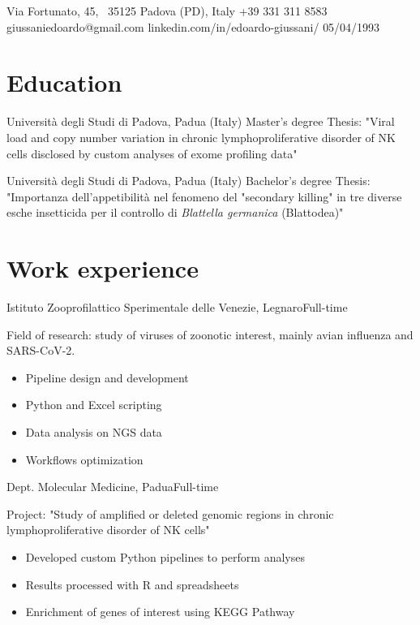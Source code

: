 \documentclass{fancy_cv}
\author{Edoardo Giussani}
\begin{document}
    {Via Fortunato, 45, \ 35125 Padova (PD), Italy}
    {+39 331 311 8583}
    {giussaniedoardo@gmail.com}
    {linkedin.com/in/edoardo-giussani/}
    {05/04/1993}

    \section{Education}
            {Università degli Studi di Padova, Padua (Italy)} {Master's degree}
            {Thesis: "Viral load and copy number variation in chronic 
            lymphoproliferative disorder of NK cells disclosed by custom analyses
            of exome profiling data"}
        \medskip

            {Università degli Studi di Padova, Padua (Italy)} {Bachelor's degree}
            {Thesis: "Importanza dell'appetibilità nel fenomeno del "secondary 
            killing" in tre diverse esche insetticida per il controllo
            di \textit{Blattella germanica} (Blattodea)"}


    \section{Work experience}
        {Istituto Zooprofilattico Sperimentale delle Venezie, Legnaro}{Full-time}
        {Field of research: study of viruses of zoonotic interest, mainly avian influenza and SARS-CoV-2.
        \begin{itemize}
            \item Pipeline design and development
            \item Python and Excel scripting
            \item Data analysis on NGS data
            \item Workflows optimization 
        \end{itemize}}
        \medskip

        {Dept. Molecular Medicine, Padua}{Full-time}
        {Project: "Study of amplified or deleted genomic regions in chronic 
        lymphoproliferative disorder of NK cells"
        \begin{itemize}
            \item Developed custom Python pipelines to perform analyses
            \item Results processed with R and spreadsheets
            \item Enrichment of genes of interest using KEGG Pathway
        \end{itemize}}
        \medskip
\end{document}
